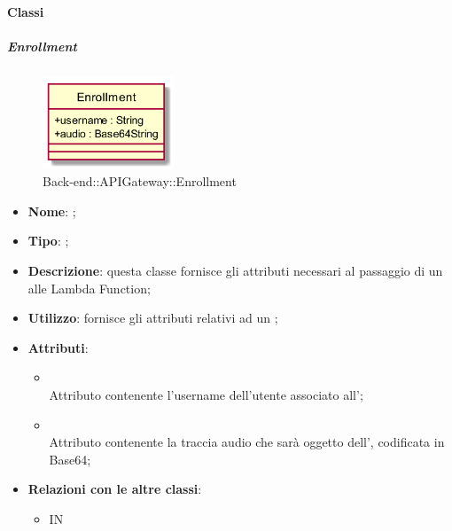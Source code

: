 \paragraph{Classi}
\hypertarget{Enrollment_label}{\subparagraph{Enrollment}}
\begin{figure}[h]
	\centering
	\includegraphics[width=0.35\textwidth,height=\textheight,keepaspectratio]{images/ClassEnrollment.png}
	\caption{Back-end::APIGateway::Enrollment}
\end{figure}
\begin{itemize}
	\item \textbf{Nome}: ;
	\item \textbf{Tipo}: ;
	\item \textbf{Descrizione}: questa classe fornisce gli attributi necessari al passaggio di un  alle Lambda Function;
	\item \textbf{Utilizzo}: fornisce gli attributi relativi ad un ;
	\item \textbf{Attributi}:
	\begin{itemize}
		\item[]  \\
		Attributo contenente l'username dell'utente associato all';
		\item[]  \\
		Attributo contenente la traccia audio che sarà oggetto dell', codificata in Base64;
	\end{itemize}
	\item \textbf{Relazioni con le altre classi}:
	\begin{itemize}
		\item IN \hyperlink{VocalAPI_label}{}
	\end{itemize}
\end{itemize}
\FloatBarrier

